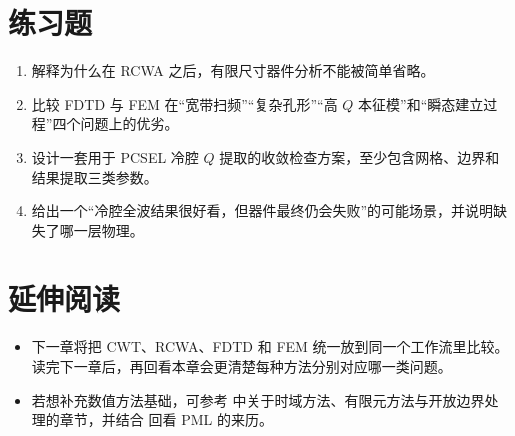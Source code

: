 \section*{练习题}
\begin{enumerate}
  \item \basicq 解释为什么在 RCWA 之后，有限尺寸器件分析不能被简单省略。

  \item \basicq 比较 FDTD 与 FEM 在“宽带扫频”“复杂孔形”“高 $Q$ 本征模”和“瞬态建立过程”四个问题上的优劣。

  \item \midq 设计一套用于 PCSEL 冷腔 $Q$ 提取的收敛检查方案，至少包含网格、边界和结果提取三类参数。

  \item \hardq 给出一个“冷腔全波结果很好看，但器件最终仍会失败”的可能场景，并说明缺失了哪一层物理。
\end{enumerate}

\section*{延伸阅读}
\begin{itemize}
  \item 下一章将把 CWT、RCWA、FDTD 和 FEM 统一放到同一个工作流里比较。读完下一章后，再回看本章会更清楚每种方法分别对应哪一类问题。

  \item 若想补充数值方法基础，可参考 \cite{taflove2005,jin2015} 中关于时域方法、有限元方法与开放边界处理的章节，并结合 \cite{berenger1994} 回看 PML 的来历。
\end{itemize}
